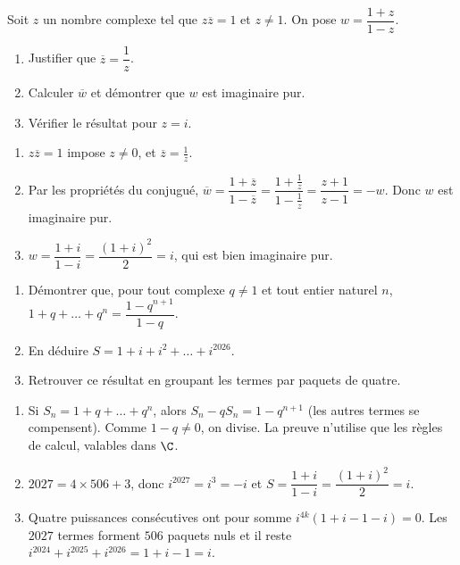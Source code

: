 \begin{exercise}
Soit $z$ un nombre complexe tel que $z\overline z=1$ et $z\neq1$. On pose $w=\dfrac{1+z}{1-z}$.
\begin{enumerate}
\item Justifier que $\overline z=\dfrac1z$.
\item Calculer $\overline w$ et démontrer que $w$ est imaginaire pur.
\item Vérifier le résultat pour $z=i$.
\end{enumerate}
\end{exercise}
\begin{solution}
\begin{enumerate}
\item $z\overline z=1$ impose $z\neq0$, et $\overline z=\frac1z$.
\item Par les propriétés du conjugué, $\overline w=\dfrac{1+\overline z}{1-\overline z}=\dfrac{1+\frac1z}{1-\frac1z}=\dfrac{z+1}{z-1}=-w$. Donc $w$ est imaginaire pur.
\item $w=\dfrac{1+i}{1-i}=\dfrac{(1+i)^2}{2}=i$, qui est bien imaginaire pur.
\end{enumerate}
\end{solution}

\begin{exercise}
\begin{enumerate}
\item Démontrer que, pour tout complexe $q\neq1$ et tout entier naturel $n$, $1+q+\dots+q^n=\dfrac{1-q^{n+1}}{1-q}$.
\item En déduire $S=1+i+i^2+\dots+i^{2026}$.
\item Retrouver ce résultat en groupant les termes par paquets de quatre.
\end{enumerate}
\end{exercise}
\begin{solution}
\begin{enumerate}
\item Si $S_n=1+q+\dots+q^n$, alors $S_n-qS_n=1-q^{n+1}$ (les autres termes se compensent). Comme $1-q\neq0$, on divise. La preuve n'utilise que les règles de calcul, valables dans $\C$.
\item $\num{2027}=4\times506+3$, donc $i^{2027}=i^3=-i$ et $S=\dfrac{1+i}{1-i}=\dfrac{(1+i)^2}{2}=i$.
\item Quatre puissances consécutives ont pour somme $i^{4k}(1+i-1-i)=0$. Les $\num{2027}$ termes forment $506$ paquets nuls et il reste $i^{2024}+i^{2025}+i^{2026}=1+i-1=i$.
\end{enumerate}
\end{solution}

